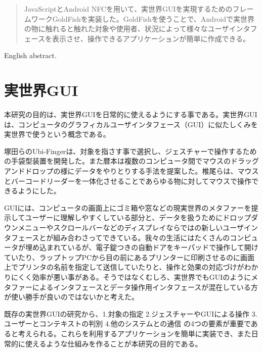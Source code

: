 
\begin{abstract}
JavaScriptとAndroid NFCを用いて、実世界GUIを実現するためのフレームワークGoldFishを実装した。GoldFishを使うことで、Androidで実世界の物に触れると触れた対象や使用者、状況によって様々なユーザインタフェースを表示させ、操作できるアプリケーションが簡単に作成できる。
\end{abstract}

\begin{eabstract}
English abstract.
\end{eabstract}

\maketitle

\section{実世界GUI}\label{sec:Introduction}
本研究の目的は、実世界GUI\cite{実世界GUI}を日常的に使えるようにする事である。実世界GUIは、コンピュータのグラフィカルユーザインタフェース（GUI）に似たしくみを実世界で使うという概念である。

塚田らのUbi-Finger\cite{Ubi-Finger}は、対象を指さす事で選択し、ジェスチャーで操作するための手袋型装置を開発した。また暦本は複数のコンピュータ間でマウスのドラッグアンドドロップの様にデータをやりとりする手法\cite{pick-and-drop}を提案した。椎尾らは、マウスとバーコードリーダーを一体化させることであらゆる物に対してマウスで操作できるようにした。\cite{field-mouse}

GUIには、コンピュータの画面上にゴミ箱や窓などの現実世界のメタファーを提示してユーザーに理解しやすくしている部分と、データを扱うためにドロップダウンメニューやスクロールバーなどのディスプレイならではの新しいユーザインタフェースとが組み合わさってできている。我々の生活にはたくさんのコンピュータが埋め込まれているが、電子錠つきの自動ドアをキーパッドで操作して開けていたり、ラップトップPCから目の前にあるプリンターに印刷させるのに画面上でプリンタの名前を指定して送信していたりと、操作と効果の対応づけがわかりにくく効率が悪い事がある。そうではなくむしろ、実世界でもGUIのようにメタファーによるインタフェースとデータ操作用インタフェースが混在している方が使い勝手が良いのではないかと考えた。

既存の実世界GUIの研究から、1.対象の指定 2.ジェスチャーやGUIによる操作 3.ユーザーとコンテキストの判別 4.他のシステムとの通信 の4つの要素が重要であると考えられる。これらを利用するアプリケーションを簡単に実装でき、また日常的に使えるような仕組みを作ることが本研究の目的である。


